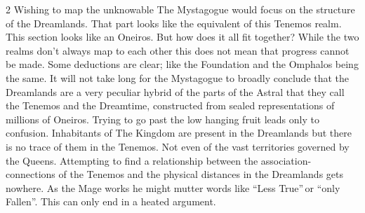 \begin{multicols}{2}
Wishing to map the unknowable The Mystagogue would focus on the structure of the Dreamlands. That part looks like the equivalent of this Tenemos realm. This section looks like an Oneiros. But how does it all fit together? While the two realms don't always map to each other this does not mean that progress cannot be made. Some deductions are clear; like the Foundation and the Omphalos being the same. It will not take long for the Mystagogue to broadly conclude that the Dreamlands are a very peculiar hybrid of the parts of the Astral that they call the Tenemos and the Dreamtime, constructed from sealed representations of millions of Oneiros. Trying to go past the low hanging fruit leads only to confusion. Inhabitants of The Kingdom are present in the Dreamlands but there is no trace of them in the Tenemos. Not even of the vast territories governed by the Queens. Attempting to find a relationship between the association-connections of the Tenemos and the physical distances in the Dreamlands gets nowhere. As the 
Mage works he might mutter words like \textquotedblleft Less True\textquotedblright\,or \textquotedblleft only Fallen\textquotedblright. This can only end in a heated argument. 


\end{multicols}